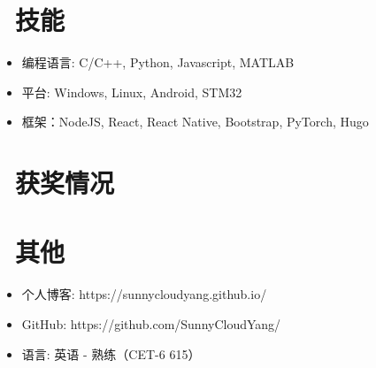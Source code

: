 \documentclass{resume}
\begin{document}

\section{\faCogs\ 技能}
\begin{itemize}
  \item 编程语言: C/C++, Python, Javascript, MATLAB
  \item 平台: Windows, Linux, Android, STM32
  \item 框架：NodeJS, React, React Native, Bootstrap, PyTorch, Hugo
\end{itemize}

\section{\faHeartO\ 获奖情况}

\section{\faInfo\ 其他}
\begin{itemize}
  \item 个人博客: https://sunnycloudyang.github.io/
  \item GitHub: https://github.com/SunnyCloudYang/
  \item 语言: 英语 - 熟练（CET-6 615）
\end{itemize}

%
%
\end{document}
